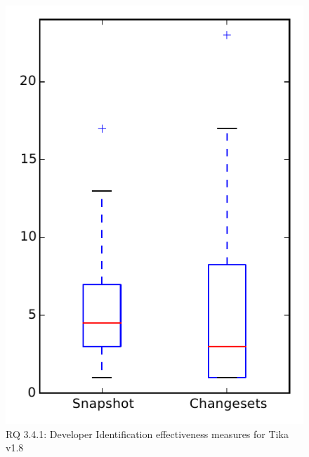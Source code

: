 
\begin{figure}
\centering
\includegraphics[height=0.4\textheight]{figures/dit/rq1_tika}
\caption{RQ 3.4.1: Developer Identification effectiveness measures for Tika v1.8}
\label{fig:dit:rq1:tika}
\end{figure}
